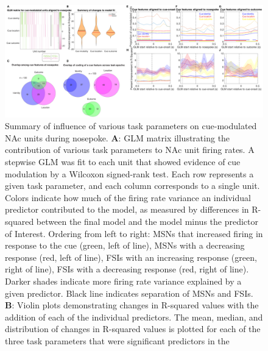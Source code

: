 \documentclass[11pt]{article}
\newcommand{\bsf}[1]{\textbf{#1}}
\providecommand{\DIFaddendFL}{} %
\DeclareRobustCommand{\DIFaddendFL}{\DIFOaddendFL \let\includegraphics\DIFOincludegraphics} %
\begin{document}
 \begin{figure}[ht!]
\centering
\includegraphics[width=\textwidth]{Fig 9 - NP GLM.pdf}
\DIFaddendFL \caption{Summary of influence of various task parameters on cue-modulated NAc
units during nosepoke. \bsf{A}: GLM matrix illustrating the contribution of various
task parameters to NAc unit firing rates. A stepwise GLM was fit to each unit that
showed evidence of cue modulation by a Wilcoxon signed-rank test. Each row
represents a given task parameter, and each column corresponds to a single unit. Colors indicate how much of the firing rate variance an
individual predictor contributed to the model, as measured by differences in
R-squared between the final model and the model minus the predictor of
Interest. Ordering from left to right: MSNs that increased firing
in response to the cue (green, left of line), MSNs with a decreasing response
(red, left of line), FSIs with an increasing response (green, right of line),
FSIs with a decreasing response (red, right of line). Darker shades indicate
more firing rate variance explained by a given predictor. Black line indicates
separation of MSNs and FSIs. \bsf{B}: Violin plots demonstrating changes in
R-squared values with the addition of each of the individual predictors. The
mean, median, and distribution of changes in R-squared values is plotted for
each of the three task parameters that were significant predictors in the
}
\end{figure}
\end{document}
